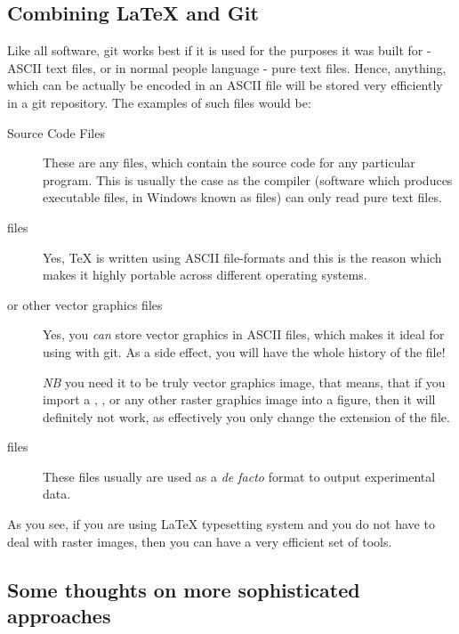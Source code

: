 \documentclass[
    draft
]{scrartcl}
\begin{document}

%
\subsection{Combining \LaTeX{} and Git}

%
Like all software, git works best if it is used for the purposes it was built
    for - ASCII text files, or in normal people language - pure text files.
%
Hence, anything, which can be actually be encoded in an ASCII file will be
    stored very efficiently in a git repository.
%
The examples of such files would be:
%
\begin{description}
    \item[Source Code Files] These are any files, which contain the source code
        for any particular program. This is usually the case as the compiler
        (software which produces executable files, in Windows known as
         files) can only read pure text files.

    \item[ files] Yes, \TeX{} is written using ASCII file-formats and
        this is the reason which makes it highly portable across different
        operating systems.

    \item[ or other vector graphics files] Yes, you \emph{can} store
        vector graphics in ASCII files, which makes it ideal for using with git.
        As a side effect, you will have the whole history of the file!

        \emph{NB} you need it to be truly vector graphics image, that means,
        that if you import a , , or any other raster
        graphics image into a  figure, then it will definitely not
        work, as effectively you only change the extension of the file.

    \item[ files] These files usually are used as a \emph{de facto}
        format to output experimental data.
\end{description}

%
As you see, if you are using \LaTeX{} typesetting system and you do not have to
    deal with raster images, then you can have a very efficient set of tools.

%
\subsection{Some thoughts on more sophisticated approaches}
\end{document}
